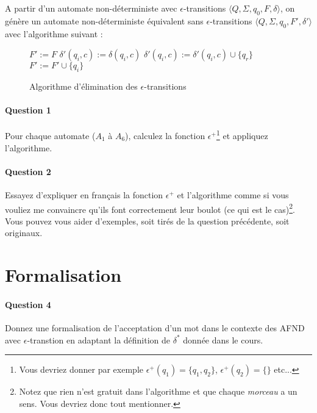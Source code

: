 \documentclass{article}[11pt]
\theoremstyle{definition}
\begin{document}
 
A partir d'un automate non-déterministe avec $\epsilon$-transitions  $\big \langle Q,\Sigma,q_0,F,\delta \big \rangle$, on génère un automate non-déterministe équivalent sans $\epsilon$-transitions  $\big \langle Q,\Sigma,q_0,F',\delta' \big \rangle$ avec l'algorithme suivant :

\begin{figure}[!h]
\begin{algorithmic}[1]
\State $F' := F$
        $\delta'(q_i,c) := \delta(q_i,c)$
    \EndFor
\EndFor
{}
			\State $\delta'(q_i,c) := \delta'(q_i,c) \cup \{q_r\}$
		\EndFor
			\State $F' := F' \cup \{q_i\}$
		\EndIf
	\EndFor
\EndFor
\end{algorithmic}
\caption{Algorithme d'élimination des $\epsilon$-transitions}
\label{algo}
\end{figure}
\vspace{2cm}
\paragraph*{Question 1} Pour chaque automate ($A_1$ à $A_6$), calculez la fonction $\epsilon^+$\footnote{Vous devriez donner par exemple $\epsilon^+(q_1) = \{q_1,q_2\}$, $\epsilon^+(q_2) = \{\}$ etc...} et appliquez l'algorithme.

\paragraph*{Question 2} Essayez d'expliquer en français la fonction $\epsilon^+$ et l'algorithme comme si vous vouliez me convaincre qu'ils font correctement leur boulot (ce qui est le cas)\footnote{Notez que rien n'est gratuit dans l'algorithme et que chaque \textit{morceau} a un sens. Vous devriez donc tout mentionner.}. Vous pouvez vous aider d'exemples, soit tirés de la question précédente, soit originaux.

\section{Formalisation}

\paragraph*{Question 4} Donnez une formalisation de l'acceptation d'un mot dans le contexte des AFND avec $\epsilon$-transtion en adaptant la définition de $\delta^*$ donnée dans le cours.
\end{document}

